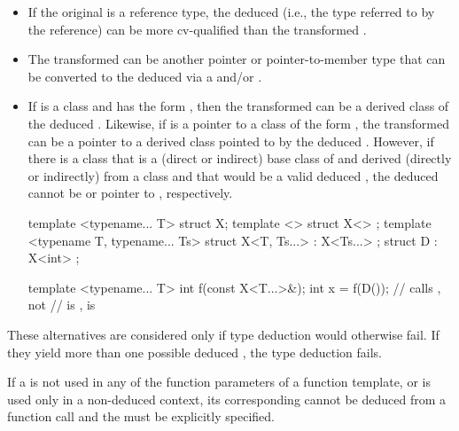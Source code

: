 \begin{itemize}
\item
If the original
is a reference type, the deduced
(i.e.,
the type referred to by the reference) can be more cv-qualified than
the transformed .
\item
The transformed 
can be another pointer or pointer-to-member type that can be converted
to the deduced
via a  and/or
.

\item
If
is a class and
has the form
,
then
the transformed 
can be a derived class  of the
deduced
.
Likewise, if
is a pointer to a class of the form
,
the transformed 
can be a pointer to a
derived class  pointed to by the deduced
.
However, if there is a class  that is
a (direct or indirect) base class of  and
derived (directly or indirectly) from a class  and
that would be a valid deduced ,
the deduced  cannot be  or pointer to ,
respectively.
\begin{example}
\begin{codeblock}
template <typename... T> struct X;
template <> struct X<> {};
template <typename T, typename... Ts>
  struct X<T, Ts...> : X<Ts...> {};
struct D : X<int> {};

template <typename... T>
int f(const X<T...>&);
int x = f(D());     // calls , not 
                    //  is ,  is 
\end{codeblock}
\end{example}
\end{itemize}

\pnum
These alternatives are considered only if type deduction would
otherwise fail.
If they yield more than one possible deduced
,
the type deduction fails.
\begin{note}
If a
is not used in any of the function parameters of a function template,
or is used only in a non-deduced context, its corresponding
cannot be deduced from a function call and the
must be explicitly specified.
\end{note}


